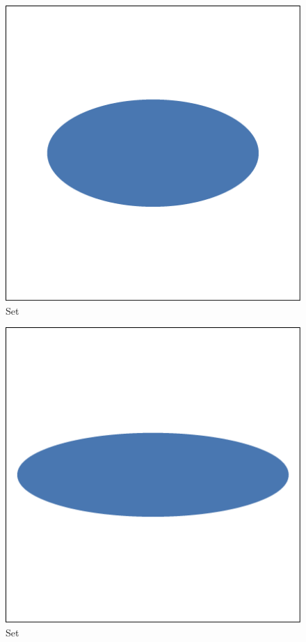 \begin{subfigure}{0.23\columnwidth}
	\centering
	\includegraphics[width=\textwidth]{experiment/img/singlesphereimpression_baakman4.png}
	\caption{Set \baakmanFour}
	\label{fig:experiment:singlesphere:projection:baakman4}
\end{subfigure}	
\begin{subfigure}{0.23\columnwidth}
	\centering
	\includegraphics[width=\textwidth]{experiment/img/singlesphereimpression_baakman5.png}
	\caption{Set \baakmanFive}
	\label{fig:experiment:singlesphere:projection:baakman5}
\end{subfigure}	